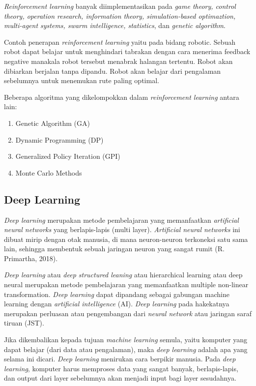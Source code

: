 \textit{Reinforcement learning} banyak diimplementasikan pada \textit{game theory, control theory, operation research, information theory, simulation-based optimaztion, multi-agent systems, swarm intelligence, statistics}, dan \textit{genetic algorithm}.

Contoh penerapan \textit{reinforcement learning} yaitu pada bidang robotic. Sebuah robot dapat belajar untuk menghindari tabrakan dengan cara menerima feedback negative manakala robot tersebut menabrak halangan tertentu. Robot akan dibiarkan berjalan tanpa dipandu. Robot akan belajar dari pengalaman sebelumnya untuk menemukan rute paling optimal. 

Beberapa algoritma yang dikelompokkan dalam \textit{reinforcement learning} antara lain:
\begin{enumerate}
	\item Genetic Algorithm (GA)
	\item Dynamic Programming (DP)
	\item Generalized Policy Iteration (GPI)
	\item Monte Carlo Methods
\end{enumerate}

\subsection{Deep Learning}
\hspace{1,2cm}\textit{Deep learning} merupakan metode pembelajaran yang memanfaatkan \textit{artificial neural networks} yang berlapis-lapis (multi layer). \textit{Artificial neural networks} ini dibuat mirip dengan otak manusia, di mana neuron-neuron terkoneksi satu sama lain, sehingga membentuk sebuah jaringan neuron yang sangat rumit (R. Primartha, 2018).

\textit{Deep learning} atau \textit{deep structured leaning} atau hierarchical learning atau deep neural merupakan metode pembelajaran yang memanfaatkan multiple non-linear transformation. \textit{Deep learning} dapat dipandang sebagai gabungan machine learning dengan \textit{artificial intelligence} (AI). \textit{Deep learning} pada hakekatnya merupakan perluasan atau pengembangan dari \textit{neural network} atau jaringan saraf tiruan (JST).

Jika dikembalikan kepada tujuan \textit{machine learning} semula, yaitu komputer yang dapat belajar (dari data atau pengalaman), maka \textit{deep learning} adalah apa yang selama ini dicari. \textit{Deep learning} menirukan cara berpikir manusia. Pada \textit{deep learning}, komputer harus memproses data yang sangat banyak, berlapis-lapis, dan output dari layer sebelumnya akan menjadi input bagi layer sesudahnya.

